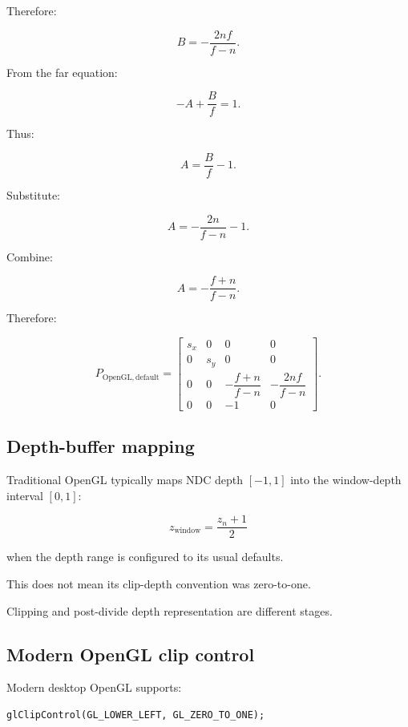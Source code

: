 Therefore:

\[
 B=-\frac{2nf}{f-n}.
\]

From the far equation:

\[
 -A+\frac Bf=1.
\]

Thus:

\[
 A=\frac Bf-1.
\]

Substitute:

\[
 A=-\frac{2n}{f-n}-1.
\]

Combine:

\[
 \boxed{ A=-\frac{f+n}{f-n} }.
\]

Therefore:

\[
 \boxed{ P_{\mathrm{OpenGL,default}}= \begin{bmatrix} s_x&0&0&0\\ 0&s_y&0&0\\ 0&0&-\dfrac{f+n}{f-n}&-\dfrac{2nf}{f-n}\\ 0&0&-1&0 \end{bmatrix} }.
\]

\subsection{Depth-buffer mapping}\label{02-foundations-ii-ch033-depth-buffer-mapping}

\hypertarget{02-foundations-ii-ch033-depth-buffer-mapping}{}

Traditional OpenGL typically maps NDC depth \([-1,1]\) into the window-depth interval \([0,1]\):

\[
 \boxed{ z_{\mathrm{window}}=\frac{z_n+1}{2} }
\]

when the depth range is configured to its usual defaults.

This does not mean its clip-depth convention was zero-to-one.

Clipping and post-divide depth representation are different stages.

\subsection{Modern OpenGL clip control}\label{02-foundations-ii-ch033-modern-opengl-clip-control}

\hypertarget{02-foundations-ii-ch033-modern-opengl-clip-control}{}

Modern desktop OpenGL supports:

\begin{verbatim}
glClipControl(GL_LOWER_LEFT, GL_ZERO_TO_ONE);
\end{verbatim}

